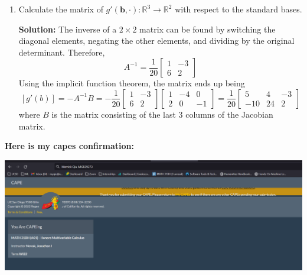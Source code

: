 \documentclass{report}
\newcommand{\solution}{\textbf{Solution: }}
\begin{document}
\begin{enumerate}
	\medskip
	\item
	Calculate the matrix of $g'(\mathbf{b},\cdot) \colon \mathbb{R}^3 \to \mathbb{R}^2$
	with respect to the standard bases.

	\solution 
	The inverse of a $2 \times 2$ matrix can be found by switching the diagonal elements,
	negating the other elements, and dividing by the original determinant.
	Therefore,
	\[
		A^{-1} = 
		\frac{1}{20}
		\begin{bmatrix}
			1 & -3 \\
			6 & 2
		\end{bmatrix}
	\]
	Using the implicit function theorem, the matrix ends up being
	\[
		[g'(b)] = 
		- A^{-1}B = 
		- \frac{1}{20}
		\begin{bmatrix}
			1 & -3 \\
			6 & 2
		\end{bmatrix}
		\begin{bmatrix}
			1 & -4 & 0 \\
			2 & 0 & -1
		\end{bmatrix} =
		\frac{1}{20}
		\begin{bmatrix}
			5 & 4 & -3 \\ 
			-10 & 24 & 2
		\end{bmatrix}
	\]
	where $B$ is the matrix consisting of the last 3 columns of the Jacobian matrix.
	\end{enumerate}

\textbf{Here is my capes confirmation:}

\includegraphics{capes.png}
\end{document}
